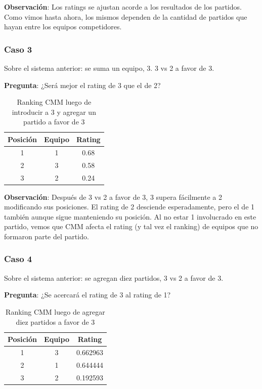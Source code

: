\textbf{Observación}: Los ratings se ajustan acorde a los resultados de los partidos. Como vimos hasta ahora, los mismos dependen de la cantidad de partidos que hayan entre los equipos competidores.

\subsubsection*{Caso 3}

Sobre el sistema anterior: se suma un equipo, 3. 3 vs 2 a favor de 3.

\textbf{Pregunta}: ¿Será mejor el rating de 3 que el de 2?

\begin{table}[h!]
    \begin{center}
        \begin{tabular}{|c|c|c|}
        \hline
        \textbf{Posición} & \textbf{Equipo} & \textbf{Rating} \\
        \hline
        1 & 1 & 0.68\\
        2 & 3 & 0.58\\
        3 & 2 & 0.24\\
        \hline
        \end{tabular}
        \caption{Ranking CMM luego de introducir a 3 y agregar un partido a favor de 3}
        \label{cmm_caso_3}
    \end{center}
\end{table}

\textbf{Observación}: Después de 3 vs 2 a favor de 3, 3 supera fácilmente a 2 modificando sus posiciones. El rating de 2 desciende esperadamente, pero el de 1 también aunque sigue manteniendo su posición. Al no estar 1 involucrado en este partido, vemos que CMM afecta el rating (y tal vez el ranking) de equipos que no formaron parte del partido.

\newpage

\subsubsection*{Caso 4}

Sobre el sistema anterior: se agregan diez partidos, 3 vs 2 a favor de 3.

\textbf{Pregunta}: ¿Se acercará el rating de 3 al rating de 1?

\begin{table}[h!]
    \begin{center}
        \begin{tabular}{|c|c|c|}
        \hline
        \textbf{Posición} & \textbf{Equipo} & \textbf{Rating} \\
        \hline
        1 & 3 & 0.662963\\
        2 & 1 & 0.644444\\
        3 & 2 & 0.192593\\
        \hline
        \end{tabular}
        \caption{Ranking CMM luego de agregar diez partidos a favor de 3}
        \label{cmm_caso_4}
    \end{center}
\end{table}

